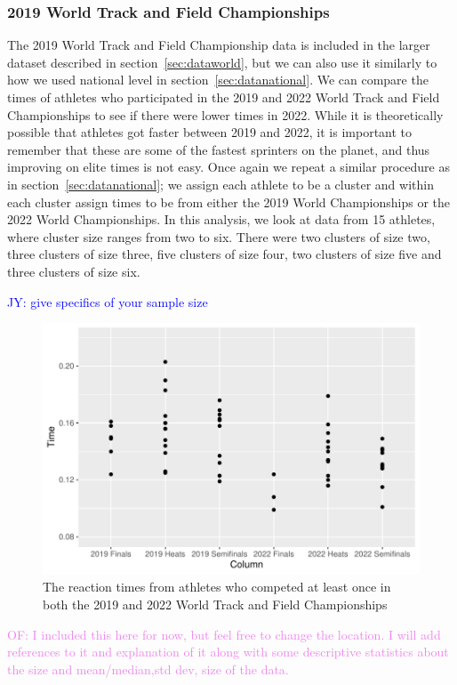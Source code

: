 \documentclass[12pt, letterpaper, titlepage]{article}
\newcommand{\jy}[1]{\textcolor{blue}{JY: #1}}
\newcommand{\of}[1]{\textcolor{violet}{OF: #1}}
\begin{document}
\subsubsection{2019 World Track and Field Championships}\label{sec:data2019}
The 2019 World Track and Field Championship data is included in the larger dataset
described in section~\ref{sec:dataworld}, but we can also use it similarly to
how we used national level in section~\ref{sec:datanational}.  We can compare
the times of athletes who participated in the 2019 and 2022 World Track and Field
Championships to see if there were lower times in 2022.  While it is theoretically
possible that athletes got faster between 2019 and 2022, it is important to
remember that these are some of the fastest sprinters on the planet, and thus
improving on elite times is not easy.  Once again we repeat a similar procedure
as in section~\ref{sec:datanational}; we assign each athlete to be a cluster and
within each cluster assign times to be from either the 2019 World Championships
or the 2022 World Championships.  In this analysis, we look at data from 15
athletes, where cluster size ranges from two to six.   There were two clusters 
of size two, three clusters of size three, five clusters of size four, two 
clusters of size five and three clusters of size six.

\jy{give specifics of your sample size}

\begin{figure}[tbp]
  \centering
  \includegraphics{Scatterplot2019vs2022}
  \caption{The reaction times from athletes who competed at least once in both 
  the 2019 and 2022 World Track and Field Championships}
  \label{fig:Scatterplot2019vs2022}
\end{figure}
\of{I included this here for now, but feel free to change the location.  I will
add references to it and explanation of it along with some descriptive statistics about
the size and mean/median,std dev, size of the data.}
\end{document}
